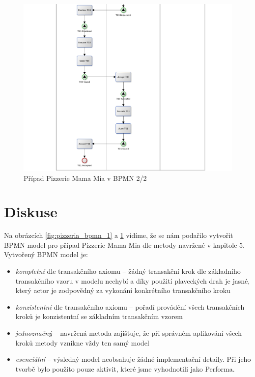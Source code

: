 \begin{center}
\begin{figure}[H]
\centerline{\includegraphics[width=1.28\textwidth,height=\textheight,keepaspectratio]{obrazky/pizzeria-bpmn-2}}
\caption{Případ Pizzerie Mama Mia v BPMN 2/2}
\label{fig:pizzeria_bpmn_2}
\end{figure}
\end{center}

\section{Diskuse}
Na obrázcích \ref{fig:pizzeria_bpmn_1} a \ref{fig:pizzeria_bpmn_2} vidíme, že se nám podařilo vytvořit BPMN model pro případ Pizzerie Mama Mia dle metody navržené v kapitole 5. Vytvořený BPMN model je:

\begin{itemize}
\item \textit{kompletní} dle transakčního axiomu – žádný transakční krok dle základního transakčního vzoru v modelu nechybí a díky použití plaveckých drah je jasné, který actor je zodpovědný za vykonání konkrétního transakčního kroku
\item \textit{konzistentní} dle transakčního axiomu – pořadí provádění všech transakčních kroků je konzistentní se základním transakčním vzorem
\item \textit{jednoznačný} – navržená metoda zajišťuje, že při správném aplikování všech kroků metody vznikne vždy ten samý model
\item \textit{esenciální} – výsledný model neobsahuje žádné implementační detaily. Při jeho tvorbě bylo použito pouze aktivit, které jsme vyhodnotili jako Performa.
\end{itemize}

